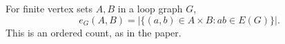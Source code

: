 \begin{definition}
For finite vertex sets \(A,B\) in a loop graph \(G\),
\[
  e_G(A,B)=|\{(a,b)\in A\times B: ab\in E(G)\}|.
\]
This is an ordered count, as in the paper.
\end{definition}
